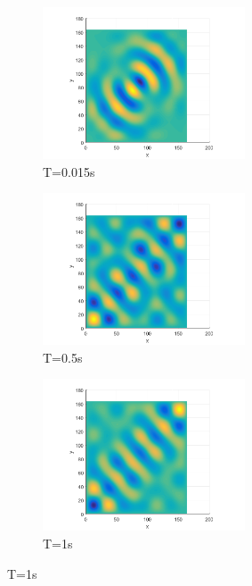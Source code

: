\begin{figure}[h]
\begin{subfigure}{0.3 \textwidth}
	\centering
	\includegraphics[width=6cm]{../Chapter_4/_Figs/Dipole001_5point_160Hz_L10m_8000Fs.png}
	\caption{T=0.015s}
\end{subfigure}
\begin{subfigure}{0.3 \textwidth}
	\centering
	\includegraphics[width=6cm]{../Chapter_4/_Figs/Dipole05_5point_160Hz_L10m_8000Fs.png}
	\caption{T=0.5s}
\end{subfigure}
\begin{subfigure}{0.3 \textwidth}
	\centering
	\includegraphics[width=6cm]{../Chapter_4/_Figs/Dipole1_5point_160Hz_L10m_8000Fs.png}
	\caption{T=1s}
\end{subfigure}
\label{figs:dipole}
\end{figure}

